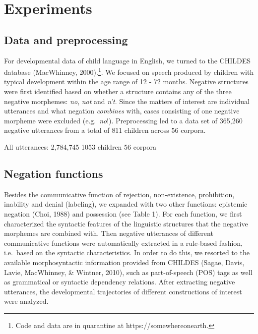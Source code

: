 \documentclass[
  english,
  man,floatsintext]{apa6}
\begin{document}
\clearpage

\hypertarget{experiments}{%
\section{Experiments}\label{experiments}}

\hypertarget{data-and-preprocessing}{%
\subsection{Data and preprocessing}\label{data-and-preprocessing}}

For developmental data of child language in English, we turned to the CHILDES database (MacWhinney, 2000).\footnote{Code and data are in quarantine at https://somewhereonearth.}. We focused on speech produced by children with typical development within the age range of 12 - 72 months. Negative structures were first identified based on whether a structure contains any of the three negative morphemes: \emph{no}, \emph{not} and \emph{n't}. Since the matters of interest are individual utterances and what negation \emph{combines} with, cases consisting of one negative morpheme were excluded (e.g.~\emph{no}!). Preprocessing led to a data set of 365,260 negative utterances from a total of 811 children across 56 corpora.

All utterances:
2,784,745
1053 children
56 corpora

\hypertarget{negation-functions}{%
\subsection{Negation functions}\label{negation-functions}}

Besides the communicative function of rejection, non-existence, prohibition, inability and denial (labeling), we expanded with two other functions: epistemic negation (Choi, 1988) and possession (see Table 1). For each function, we first characterized the syntactic features of the linguistic structures that the negative morphemes are combined with. Then negative utterances of different communicative functions were automatically extracted in a rule-based fashion, i.e.~based on the syntactic characteristics. In order to do this, we resorted to the available morphosyntactic information provided from CHILDES (Sagae, Davis, Lavie, MacWhinney, \& Wintner, 2010), such as part-of-speech (POS) tags as well as grammatical or syntactic dependency relations. After extracting negative utterances, the developmental trajectories of different constructions of interest were analyzed.
\end{document}
